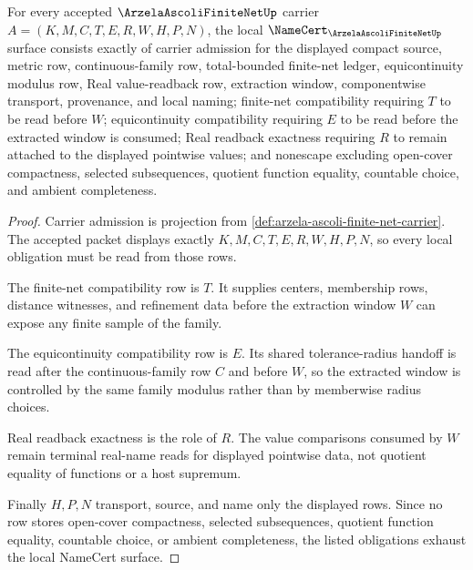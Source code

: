 \begin{theorem}
\label{thm:arzela-ascoli-finite-net-obligations}
For every accepted $\ArzelaAscoliFiniteNetUp$ carrier $A=(K,M,C,T,E,R,W,H,P,N)$, the local $\NameCert_{\ArzelaAscoliFiniteNetUp}$ surface consists exactly of carrier admission for the displayed compact source, metric row, continuous-family row, total-bounded finite-net ledger, equicontinuity modulus row, Real value-readback row, extraction window, componentwise transport, provenance, and local naming; finite-net compatibility requiring $T$ to be read before $W$; equicontinuity compatibility requiring $E$ to be read before the extracted window is consumed; Real readback exactness requiring $R$ to remain attached to the displayed pointwise values; and nonescape excluding open-cover compactness, selected subsequences, quotient function equality, countable choice, and ambient completeness.
\end{theorem}
\begin{proof}
Carrier admission is projection from \autoref{def:arzela-ascoli-finite-net-carrier}. The accepted packet displays exactly $K,M,C,T,E,R,W,H,P,N$, so every local obligation must be read from those rows.

The finite-net compatibility row is $T$. It supplies centers, membership rows, distance witnesses, and refinement data before the extraction window $W$ can expose any finite sample of the family.

The equicontinuity compatibility row is $E$. Its shared tolerance-radius handoff is read after the continuous-family row $C$ and before $W$, so the extracted window is controlled by the same family modulus rather than by memberwise radius choices.

Real readback exactness is the role of $R$. The value comparisons consumed by $W$ remain terminal real-name reads for displayed pointwise data, not quotient equality of functions or a host supremum.

Finally $H,P,N$ transport, source, and name only the displayed rows. Since no row stores open-cover compactness, selected subsequences, quotient function equality, countable choice, or ambient completeness, the listed obligations exhaust the local NameCert surface.
\end{proof}

